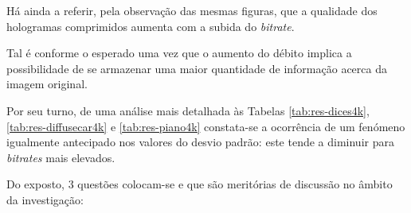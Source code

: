 Há ainda a referir, pela observação das mesmas figuras, que a qualidade dos hologramas comprimidos aumenta com a subida do \textit{bitrate}.

    Tal é conforme o esperado uma vez que o aumento do débito implica a possibilidade de se armazenar uma maior quantidade de informação acerca da imagem original.

Por seu turno, de uma análise mais detalhada às Tabelas \ref{tab:res-dices4k}, \ref{tab:res-diffusecar4k} e \ref{tab:res-piano4k} constata-se a ocorrência de um fenómeno igualmente antecipado nos valores do desvio padrão: este tende a diminuir para \textit{bitrates} mais elevados.



Do exposto, 3 questões colocam-se e que são meritórias de discussão no âmbito da investigação:

